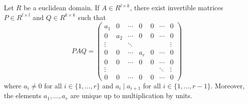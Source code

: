 \begin{theorem}
Let $R$ be a euclidean domain. If $A\in R^{l\times k}$,  
there exist invertible matrices $P\in R^{l\times l}$ and $Q\in R^{k\times k}$ such that 
\[
PAQ=\begin{pmatrix}
a_1 & 0 & \cdots & 0 & 0 & \cdots & 0\\
0 & a_2 & \cdots & 0 & 0 & \cdots & 0\\
\vdots && \ddots &  & & & \vdots\\	
0 & 0 & \cdots & a_r & 0 & \cdots & 0\\	
0 & 0 & \cdots & 0 & 0 & \cdots & 0\\	
\vdots &&&&&\ddots &\vdots\\
0 & 0 & \cdots & 0 & 0 & \cdots & 0
\end{pmatrix}
\]
where $a_i\ne0$ for all $i\in\{1,\dots,r\}$ and $a_i\mid a_{i+1}$ for all $i\in\{1,\dots,r-1\}$.
Moreover, the elements $a_1,\dots,a_r$ are unique up to multiplication by
units. 
\end{theorem}

